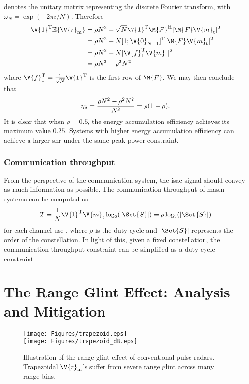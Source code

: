 \documentclass[journal,a4paper,10pt, romanappendices]{IEEEtran}
\begin{document}
denotes the unitary matrix representing the discrete Fourier transform, with $\omega_N=\exp(-2\pi i/N)$. Therefore
$$
\begin{aligned}
\V{1}^{\rm T}\mathbb{E}\{\V{r}_{\rm m}\}&=\rho N^2 - \sqrt{N}\V{1}^{\rm T}\M{F}^{\rm H}|\M{F}\V{m}_{\rm t}|^2\\
&=\rho N^2 - N [1; \V{0}_{N-1}]^{\rm T}|\M{F}\V{m}_{\rm t}|^2\\
&= \rho N^2 - N |\V{f}_1^{\rm T}\V{m}_{\rm t}|^2\\
&= \rho N^2 - \rho^2 N^2.
\end{aligned}
$$
where $\V{f}_1^{\rm T}=\frac{1}{\sqrt{N}}\V{1}^{\rm T}$ is the first row of $\M{F}$. We may then conclude that
$$
\eta_{\rm S} = \frac{\rho N^2 - \rho^2 N^2}{N^2} = \rho(1-\rho).
$$
It is clear that when $\rho=0.5$, the energy accumulation efficiency achieves its maximum value $0.25$. Systems with higher energy accumulation efficiency can achieve a larger \ac{snr} under the same peak power constraint.

\subsubsection{Communication throughput}
From the perspective of the communication system, the \ac{isac} signal should convey as much information as possible. The communication throughput of \ac{masm} systems can be computed as
\begin{equation}
T = \frac{1}{N} \V{1}^{\rm T} \V{m}_{\rm t} \log_2(|\Set{S}|) = \rho \log_2(|\Set{S}|)
\end{equation}
for each channel use \cite{throughput}, where $\rho$ is the duty cycle and $|\Set{S}|$ represents the order of the constellation. In light of this, given a fixed constellation, the communication throughput constraint can be simplified as a duty cycle constraint.

\section{The Range Glint Effect: Analysis and Mitigation}\label{sec:range_glint}
\begin{figure}[t]
    \centering
    \texttt{[image: Figures/trapezoid.eps]}\\
    \texttt{[image: Figures/trapezoid\_dB.eps]}
    \caption{Illustration of the range glint effect of conventional pulse radars. Trapezoidal $\V{r}_{\rm m}$'s suffer from severe range glint across many range bins.}
    \label{fig:trapezoid}
    \vspace{-4mm}
\end{figure}
\end{document}

